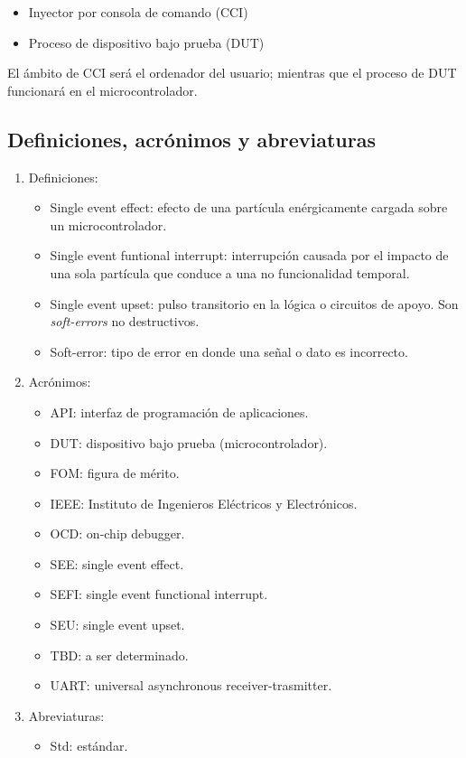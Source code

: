 \documentclass[
11pt, %
codirector, %
]{charter}
\begin{document}
\begin{itemize}
	\item Inyector por consola de comando (CCI)
	\item Proceso de dispositivo bajo prueba (DUT)
\end{itemize}

El ámbito de CCI será el ordenador del usuario; mientras que el proceso de DUT funcionará en el microcontrolador.

\subsection{Definiciones, acrónimos y abreviaturas}
\label{sub:definiciones}

\begin{enumerate}
	\item Definiciones:
		\begin{itemize}
			\item Single event effect: efecto de una partícula enérgicamente cargada sobre un microcontrolador.
			\item Single event funtional interrupt: interrupción causada por el impacto de una sola partícula que conduce a una no funcionalidad temporal.
			\item Single event upset: pulso transitorio en la lógica o circuitos de apoyo. Son \emph{soft-errors} no destructivos.
			\item Soft-error: tipo de error en donde una señal o dato es incorrecto.
		\end{itemize}
	\item Acrónimos:
		\begin{itemize}
			\item API: interfaz de programación de aplicaciones.
			\item DUT: dispositivo bajo prueba (microcontrolador).
			\item FOM: figura de mérito.
			\item IEEE: Instituto de Ingenieros Eléctricos y Electrónicos.
			\item OCD: on-chip debugger.
			\item SEE: single event effect.
			\item SEFI: single event functional interrupt.
			\item SEU: single event upset.
			\item TBD: a ser determinado.
			\item UART: universal asynchronous receiver-trasmitter.
		\end{itemize}
	\item Abreviaturas:
		\begin{itemize}
			\item Std: estándar.
		\end{itemize}
\end{enumerate}
\end{document}
